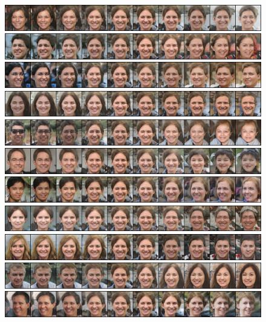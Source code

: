 \documentclass{article}
\begin{document}
\begin{figure}[H]
  \centering
  \includegraphics[width=0.9\linewidth]{eigen/raw_gan_0.png}
  \includegraphics[width=0.9\linewidth]{eigen/raw_gan_1.png}
  \includegraphics[width=0.9\linewidth]{eigen/raw_gan_2.png}
  \includegraphics[width=0.9\linewidth]{eigen/raw_gan_3.png}
  \includegraphics[width=0.9\linewidth]{eigen/raw_gan_4.png}
  \includegraphics[width=0.9\linewidth]{eigen/raw_gan_5.png}
  \includegraphics[width=0.9\linewidth]{eigen/raw_gan_6.png}
  \includegraphics[width=0.9\linewidth]{eigen/raw_gan_7.png}
  \includegraphics[width=0.9\linewidth]{eigen/raw_gan_8.png}
  \includegraphics[width=0.9\linewidth]{eigen/raw_gan_9.png}
  \includegraphics[width=0.9\linewidth]{eigen/raw_gan_10.png}

\end{figure}
\end{document}
